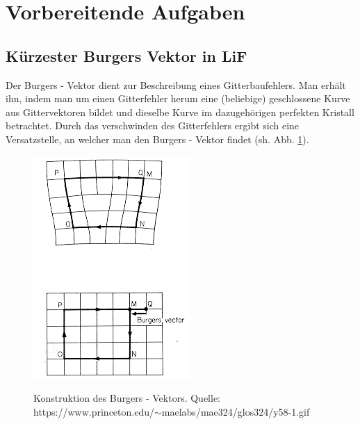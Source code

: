 ﻿\section{Vorbereitende Aufgaben}
    \subsection{Kürzester Burgers Vektor in LiF}
	Der Burgers - Vektor dient zur Beschreibung eines Gitterbaufehlers. Man erhält ihn, indem man um einen Gitterfehler herum eine (beliebige) geschlossene Kurve aus
	Gittervektoren bildet und dieselbe Kurve im dazugehörigen perfekten Kristall betrachtet. Durch das verschwinden des Gitterfehlers ergibt sich eine Versatzstelle,
	an welcher man den Burgers - Vektor findet (sh. Abb. \ref{FigBurger}).
	
	\begin{figure}[H]
            \centering
            \includegraphics[width=\textwidth]{Images/Burger.gif}
            \label{FigBurger}
            \caption{Konstruktion des Burgers - Vektors. Quelle: https://www.princeton.edu/$\sim$maelabs/mae324/glos324/y58-1.gif}
        \end{figure}

